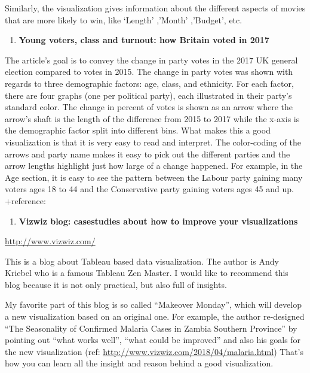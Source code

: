 \documentclass[]{book}
\providecommand{\tightlist}{%
  \setlength{\itemsep}{0pt}\setlength{\parskip}{0pt}}
\theoremstyle{definition}
\theoremstyle{definition}
\theoremstyle{definition}
\theoremstyle{remark}
\begin{document}
Similarly, the visualization gives information about the different
aspects of movies that are more likely to win, like `Length' ,'Month'
,'Budget', etc.

\begin{enumerate}
\def\labelenumi{\arabic{enumi}.}
\setcounter{enumi}{10}
\tightlist
\item
  \textbf{Young voters, class and turnout: how Britain voted in 2017}
\end{enumerate}

The article's goal is to convey the change in party votes in the 2017 UK
general election compared to votes in 2015. The change in party votes
was shown with regards to three demographic factors: age, class, and
ethnicity. For each factor, there are four graphs (one per political
party), each illustrated in their party's standard color. The change in
percent of votes is shown as an arrow where the arrow's shaft is the
length of the difference from 2015 to 2017 while the x-axis is the
demographic factor split into different bins. What makes this a good
visualization is that it is very easy to read and interpret. The
color-coding of the arrows and party name makes it easy to pick out the
different parties and the arrow lengths highlight just how large of a
change happened. For example, in the Age section, it is easy to see the
pattern between the Labour party gaining many voters ages 18 to 44 and
the Conservative party gaining voters ages 45 and up. +reference:
\citep{UKvotes2017}

\begin{enumerate}
\def\labelenumi{\arabic{enumi}.}
\setcounter{enumi}{11}
\tightlist
\item
  \textbf{Vizwiz blog: casestudies about how to improve your
  visualizations}
\end{enumerate}

\url{http://www.vizwiz.com/}

This is a blog about Tableau based data visualization. The author is
Andy Kriebel who is a famous Tableau Zen Master. I would like to
recommend this blog because it is not only practical, but also full of
insights.

My favorite part of this blog is so called ``Makeover Monday'', which
will develop a new visualization based on an original one. For example,
the author re-designed ``The Seasonality of Confirmed Malaria Cases in
Zambia Southern Province'' by pointing out ``what works well'', ``what
could be improved'' and also his goals for the new visualization (ref:
\url{http://www.vizwiz.com/2018/04/malaria.html}) That's how you can
learn all the insight and reason behind a good visualization.
\end{document}
